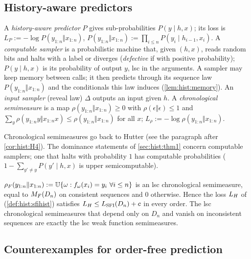 \subsection{History-aware predictors}\label{sec:hist:setting}

\begin{definition}\label{def:hist:predictor}
A \emph{history-aware predictor} $P$ gives sub-probabilities $P(y\mid h,x)$; its loss is $L_P:=-\log P(y_{1:n}\Vert x_{1:n})$, $P(y_{1:n}\Vert x_{1:n}):=\prod_{i\le n}P(y_i\mid h_{i-1},x_i)$. A \emph{computable sampler} is a probabilistic machine that, given $(h,x)$, reads random bits and halts with a label or diverges (\emph{defective} if with positive probability); $P(y\mid h,x)$ is its probability of output $y$, lsc in the arguments. A sampler may keep memory between calls; it then predicts through its sequence law $P(y_{1:n}\Vert x_{1:n})$ and the conditionals this law induces (\cref{lem:hist:memory}). An \emph{input sampler} (reveal law) $\Delta$ outputs an input given $h$. A \emph{chronological semimeasure} is a map $\rho(y_{1:n}\Vert x_{1:n})\ge0$ with $\rho(\epsilon\Vert\epsilon)\le1$ and $\sum_y\rho(y_{1:n}y\Vert x_{1:n}x)\le\rho(y_{1:n}\Vert x_{1:n})$ for all $x$; $L_\rho:=-\log\rho(y_{1:n}\Vert x_{1:n})$.
\end{definition}

Chronological semimeasures go back to Hutter (see the paragraph after \cref{cor:hist:H4}). The dominance statements of \cref{sec:hist:thm1} concern computable samplers; one that halts with probability $1$ has computable probabilities ($1-\sum_{y'\ne y}P(y'\mid h,x)$ is upper semicomputable).

\begin{lemma}\label{lem:hist:chrono}
$\rho_F(y_{1:n}\Vert x_{1:n}):=\mathbb{U}\{\omega:f_\omega(x_i)=y_i\ \forall i\le n\}$ is an lsc chronological semimeasure, equal to $M_{F}(D_n)$ on consistent sequences and $0$ otherwise. Hence the loss $L_{H}$ of \SFIhist{} (\cref{def:hist:sfihist}) satisfies $L_{H}\le L_{\mathrm{SFI}}(D_n)+c$ in every order. The lsc chronological semimeasures that depend only on $D_n$ and vanish on inconsistent sequences are exactly the lsc weak function semimeasures.
\end{lemma}

\subsection{Counterexamples for order-free prediction}\label{sec:hist:counter}

